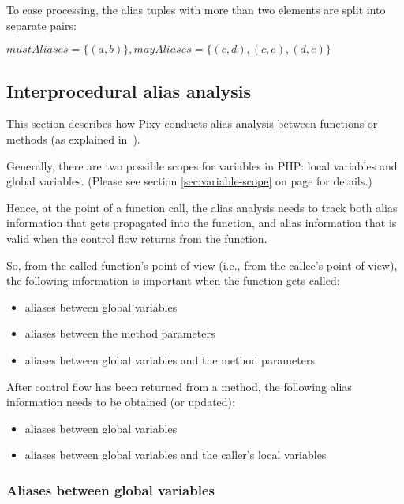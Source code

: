 To ease processing, the alias tuples with more than two elements are split into separate pairs:

$mustAliases = \{(a, b)\}, mayAliases = \{(c, d), (c, e), (d, e)\}$


\subsection{Interprocedural alias analysis}
\label{sec:interprocedural-alias-analysis}

This section describes how Pixy conducts alias analysis between functions or methods (as explained in~\cite{pixy}).

Generally, there are two possible scopes for variables in PHP: local variables and global variables. (Please see section \ref{sec:variable-scope} on page \pageref{sec:variable-scope} for details.)

Hence, at the point of a function call, the alias analysis needs to track both alias information that gets propagated into the function, and alias information that is valid when the control flow returns from the function.

So, from the called function's point of view (i.e., from the callee's point of view), the following information is important when the function gets called:

\begin{itemize}
  \item aliases between global variables
  \item aliases between the method parameters
  \item aliases between global variables and the method parameters
\end{itemize}

After control flow has been returned from a method, the following alias information needs to be obtained (or updated):

\begin{itemize}
  \item aliases between global variables
  \item aliases between global variables and the caller's local variables
\end{itemize}


\subsubsection{Aliases between global variables}
\label{sec:aliases-globals}

